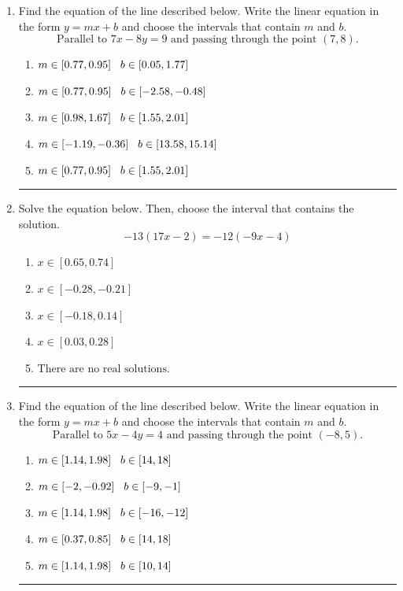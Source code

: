 \documentclass[14pt]{extbook}
\newcommand{\litem}[1]{\item#1\hspace*{-1cm}\rule{\textwidth}{0.4pt}}
\begin{document}
\begin{enumerate}
{\begin{enumerate}[label=\Alph*.]
\end{enumerate} }
\litem{
Find the equation of the line described below. Write the linear equation in the form $ y=mx+b $ and choose the intervals that contain $m$ and $b$.\[ \text{Parallel to } 7 x - 8 y = 9 \text{ and passing through the point } (7, 8). \]\begin{enumerate}[label=\Alph*.]
\item \( m \in [0.77, 0.95] \hspace*{3mm} b \in [0.05, 1.77] \)
\item \( m \in [0.77, 0.95] \hspace*{3mm} b \in [-2.58, -0.48] \)
\item \( m \in [0.98, 1.67] \hspace*{3mm} b \in [1.55, 2.01] \)
\item \( m \in [-1.19, -0.36] \hspace*{3mm} b \in [13.58, 15.14] \)
\item \( m \in [0.77, 0.95] \hspace*{3mm} b \in [1.55, 2.01] \)

\end{enumerate} }
\litem{
Solve the equation below. Then, choose the interval that contains the solution.\[ -13(17x -2) = -12(-9x -4) \]\begin{enumerate}[label=\Alph*.]
\item \( x \in [0.65, 0.74] \)
\item \( x \in [-0.28, -0.21] \)
\item \( x \in [-0.18, 0.14] \)
\item \( x \in [0.03, 0.28] \)
\item \( \text{There are no real solutions.} \)

\end{enumerate} }
\litem{
Find the equation of the line described below. Write the linear equation in the form $ y=mx+b $ and choose the intervals that contain $m$ and $b$.\[ \text{Parallel to } 5 x - 4 y = 4 \text{ and passing through the point } (-8, 5). \]\begin{enumerate}[label=\Alph*.]
\item \( m \in [1.14, 1.98] \hspace*{3mm} b \in [14, 18] \)
\item \( m \in [-2, -0.92] \hspace*{3mm} b \in [-9, -1] \)
\item \( m \in [1.14, 1.98] \hspace*{3mm} b \in [-16, -12] \)
\item \( m \in [0.37, 0.85] \hspace*{3mm} b \in [14, 18] \)
\item \( m \in [1.14, 1.98] \hspace*{3mm} b \in [10, 14] \)


\end{enumerate}}
\end{enumerate}
\end{document}
